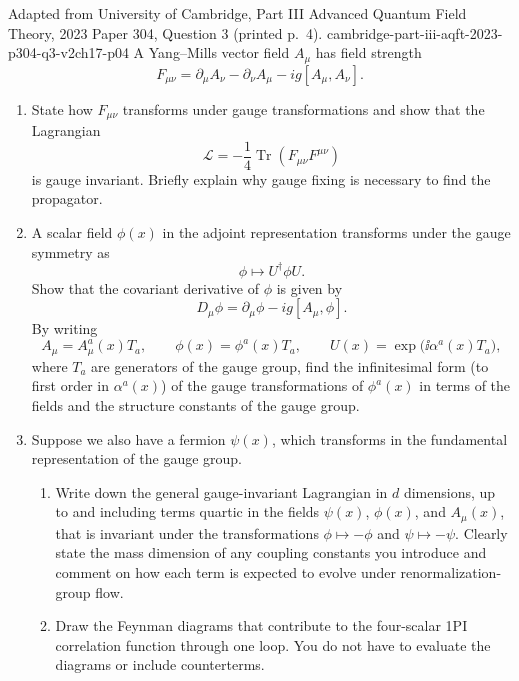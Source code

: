 \begin{enumerate}
  {Adapted from University of Cambridge, Part III Advanced Quantum
  Field Theory, 2023 Paper 304, Question 3 (printed p.~4).}
  {cambridge-part-iii-aqft-2023-p304-q3-v2ch17-p04}
  A Yang--Mills vector field \(A_\mu\) has field strength
  \[
    F_{\mu\nu}=\partial_\mu A_\nu-\partial_\nu A_\mu
      -ig[A_\mu,A_\nu].
  \]
  \begin{enumerate}
    \item[(a)] State how \(F_{\mu\nu}\) transforms under gauge
      transformations and show that the Lagrangian
      \[
        \mathcal L=-\frac14\operatorname{Tr}
          (F_{\mu\nu}F^{\mu\nu})
      \]
      is gauge invariant.  Briefly explain why gauge fixing is necessary
      to find the propagator.
    \item[(b)] A scalar field \(\phi(x)\) in the adjoint representation
      transforms under the gauge symmetry as
      \[
        \phi\longmapsto U^\dagger\phi U.
      \]
      Show that the covariant derivative of \(\phi\) is given by
      \[
        D_\mu\phi=\partial_\mu\phi-ig[A_\mu,\phi].
      \]
      By writing
      \[
        A_\mu=A_\mu^a(x)T_a,\qquad
        \phi(x)=\phi^a(x)T_a,\qquad
        U(x)=\exp\!\bigl(\ii\alpha^a(x)T_a\bigr),
      \]
      where \(T_a\) are generators of the gauge group, find the
      infinitesimal form (to first order in \(\alpha^a(x)\)) of the gauge
      transformations of \(\phi^a(x)\) in terms of the fields and the
      structure constants of the gauge group.
    \item[(c)] Suppose we also have a fermion \(\psi(x)\), which transforms
      in the fundamental representation of the gauge group.
      \begin{enumerate}
        \item[(i)] Write down the general gauge-invariant Lagrangian in
          \(d\) dimensions, up to and including terms quartic in the fields
          \(\psi(x)\), \(\phi(x)\), and \(A_\mu(x)\), that is invariant
          under the transformations
          \(\phi\mapsto-\phi\) and \(\psi\mapsto-\psi\).  Clearly state
          the mass dimension of any coupling constants you introduce and
          comment on how each term is expected to evolve under
          renormalization-group flow.
        \item[(ii)] Draw the Feynman diagrams that contribute to the
          four-scalar 1PI correlation function through one loop.  You do
          not have to evaluate the diagrams or include counterterms.
      \end{enumerate}
  \end{enumerate}


\end{enumerate}
